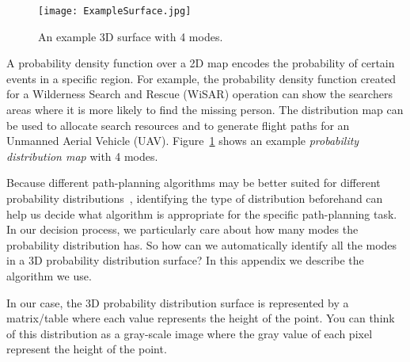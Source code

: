 \begin{figure}
\centering
\texttt{[image: ExampleSurface.jpg]}
\caption{An example 3D surface with 4 modes.}
\label{4modes}
\end{figure}



A probability density function over a 2D map encodes the probability of certain events in a specific region. For example, the probability density function created for a Wilderness Search and Rescue (WiSAR) operation can show the searchers areas where it is more likely to find the missing person. The distribution map can be used to allocate search resources and to generate flight paths for an Unmanned Aerial Vehicle (UAV). Figure~\ref{4modes} shows an example \textit{probability distribution map} with 4 modes.

Because different path-planning algorithms may be better suited for different probability distributions~\cite{Wolpert1997No}, identifying the type of distribution beforehand can help us decide what algorithm is appropriate for the specific path-planning task. In our decision process, we particularly care about how many modes the probability distribution has. So how can we automatically identify all the modes in a 3D probability distribution surface? In this appendix we describe the algorithm we use.

In our case, the 3D probability distribution surface is represented by a matrix/table where each value represents the height of the point. You can think of this distribution as a gray-scale image where the gray value of each pixel represent the height of the point.

